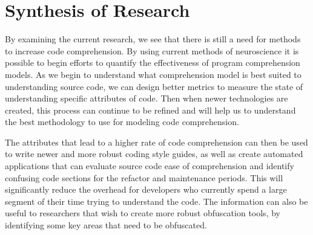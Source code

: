 \section{Synthesis of Research}\label{sec-compare}
By examining the current research, we see that there is still a need for methods to increase code comprehension. By using current methods of neuroscience \cite{siegmund_measuring_2017, siegmund_understanding_2014, yeh_detecting_2017, nakagawa_quantifying_2014} it is possible to begin efforts to quantify the effectiveness of program comprehension models. As we begin to understand what comprehension model is best suited to understanding source code, we can design better metrics to measure the state of understanding specific attributes of code. Then when newer technologies are created, this process can continue to be refined and will help us to understand the best methodology to use for modeling code comprehension\cite{siegmund_measuring_2017}.

The attributes that lead to a higher rate of code comprehension can then be used to write newer and more robust coding style guides, as well as create automated applications that can evaluate source code ease of comprehension and identify confusing code sections for the refactor and maintenance periods. This will significantly reduce the overhead for developers who currently spend a large segment of their time trying to understand the code. The information can also be useful to researchers that wish to create more robust obfuscation tools, by identifying some key areas that need to be obfuscated.

